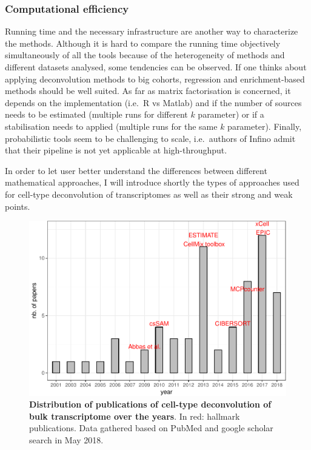 \documentclass[12pt,]{book}
\theoremstyle{definition}
\theoremstyle{definition}
\theoremstyle{definition}
\theoremstyle{remark}
\begin{document}
\hypertarget{computational-efficiency}{%
\subsubsection{Computational
efficiency}\label{computational-efficiency}}

Running time and the necessary infrastructure are another way to
characterize the methods. Although it is hard to compare the running
time objectively simultaneously of all the tools because of the
heterogeneity of methods and different datasets analysed, some
tendencies can be observed. If one thinks about applying deconvolution
methods to big cohorts, regression and enrichment-based methods should
be well suited. As far as matrix factorisation is concerned, it depends
on the implementation (i.e.~R vs Matlab) and if the number of sources
needs to be estimated (multiple runs for different \(k\) parameter) or
if a stabilisation needs to applied (multiple runs for the same \(k\)
parameter). Finally, probabilistic tools seem to be challenging to
scale, i.e.~authors of Infino admit that their pipeline is not yet
applicable at high-throughput.

In order to let user better understand the differences between different
mathematical approaches, I will introduce shortly the types of
approaches used for cell-type deconvolution of transcriptomes as well as
their strong and weak points.

\begin{figure}

{\centering \includegraphics[width=0.7\linewidth]{UCzPhDThesis_files/figure-latex/pubyear-1} 

}

\caption[Distribution of publications of cell-type deconvolution of bulk transcriptome over the years]{\textbf{Distribution of publications of cell-type
deconvolution of bulk transcriptome over the years}. In red: hallmark
publications. Data gathered based on PubMed and google scholar search in
May 2018.}\label{fig:pubyear}
\end{figure}
\end{document}
